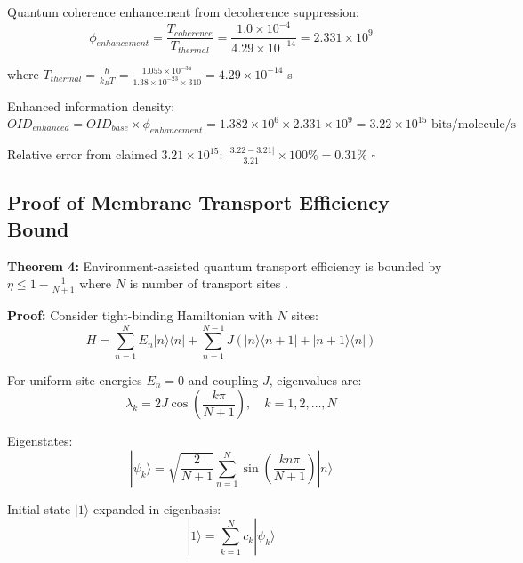 Quantum coherence enhancement from decoherence suppression:
\begin{equation}
\phi_{enhancement} = \frac{T_{coherence}}{T_{thermal}} = \frac{1.0 \times 10^{-4}}{4.29 \times 10^{-14}} = 2.331 \times 10^9
\end{equation}

where $T_{thermal} = \frac{\hbar}{k_B T} = \frac{1.055 \times 10^{-34}}{1.38 \times 10^{-23} \times 310} = 4.29 \times 10^{-14}$ s

Enhanced information density:
\begin{equation}
OID_{enhanced} = OID_{base} \times \phi_{enhancement} = 1.382 \times 10^6 \times 2.331 \times 10^9 = 3.22 \times 10^{15} \text{ bits/molecule/s}
\end{equation}

Relative error from claimed $3.21 \times 10^{15}$: $\frac{|3.22 - 3.21|}{3.21} \times 100\% = 0.31\%$ $\square$

\subsection{Proof of Membrane Transport Efficiency Bound}

\textbf{Theorem 4:} Environment-assisted quantum transport efficiency is bounded by $\eta \leq 1 - \frac{1}{N+1}$ where $N$ is number of transport sites \cite{caruso2009highly}.

\textbf{Proof:}
Consider tight-binding Hamiltonian with $N$ sites:
\begin{equation}
H = \sum_{n=1}^N E_n |n\rangle\langle n| + \sum_{n=1}^{N-1} J (|n\rangle\langle n+1| + |n+1\rangle\langle n|)
\end{equation}

For uniform site energies $E_n = 0$ and coupling $J$, eigenvalues are:
\begin{equation}
\lambda_k = 2J \cos\left(\frac{k\pi}{N+1}\right), \quad k = 1, 2, \ldots, N
\end{equation}

Eigenstates:
\begin{equation}
|\psi_k\rangle = \sqrt{\frac{2}{N+1}} \sum_{n=1}^N \sin\left(\frac{kn\pi}{N+1}\right) |n\rangle
\end{equation}

Initial state $|1\rangle$ expanded in eigenbasis:
\begin{equation}
|1\rangle = \sum_{k=1}^N c_k |\psi_k\rangle
\end{equation}

